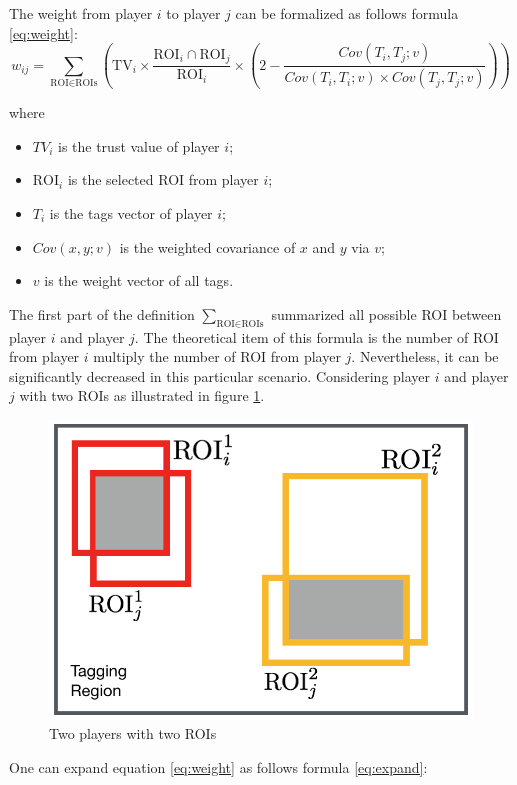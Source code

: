 \begin{definition}
The weight from player $i$ to player $j$ can be formalized as follows formula \ref{eq:weight}:
\begin{equation}
\label{eq:weight}
w_{ij} = 
\sum_{\text{ROI}\in\text{ROIs}}{\left(
  \text{TV}_i \times
  \frac{\text{ROI}_i\cap\text{ROI}_j}{\text{ROI}_i}\times
  \left( 2-\frac{Cov(T_i, T_j; v)}
      {Cov(T_i, T_i; v)\times Cov(T_j, T_j; v)} \right)\right)
}
\end{equation}

where 

\begin{itemize}
  \item $TV_i$ is the trust value of player $i$;
  \item $\text{ROI}_i$ is the selected ROI from player $i$;
  \item $T_i$ is the tags vector of player $i$;
  \item $Cov(x, y; v)$ is the weighted covariance of $x$ and $y$ via $v$;
  \item $v$ is the weight vector of all tags.
\end{itemize}
\end{definition}

The first part of the definition $\sum_{\text{ROI}\in\text{ROIs}}$ summarized all possible 
ROI between player $i$ and player $j$. The theoretical item of this formula is the number
of ROI from player $i$ multiply the number of ROI from player $j$. Nevertheless, it can be
significantly decreased in this particular scenario. Considering player $i$ and player $j$ 
with two ROIs as illustrated in figure \ref{fig:performance}.

\begin{figure}[htp]
\centering
\includegraphics[width=0.5\columnwidth]{figures/performance}
\caption{Two players with two ROIs}
\label{fig:performance}
\end{figure}

One can expand equation \ref{eq:weight} as follows formula \ref{eq:expand}:

